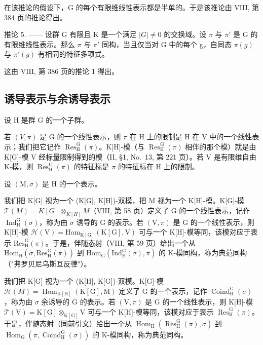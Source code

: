 在该推论的假设下，G 的每个有限维线性表示都是半单的。于是该推论由 VIII, 第 384 页的推论得出。

推论 5. —— 设群 G 有限且 K 是一个满足 \(|G| \neq 0\) 的交换域。设 \(\pi\) 与 \(\pi'\) 是 G 的有限维线性表示。那么 \(\pi\) 与 \(\pi'\) 同构，当且仅当对 G 中的每个 g，自同态 \(\pi(g)\) 与 \(\pi'(g)\) 有相同的特征多项式。

这由 VIII, 第 386 页的推论 1 得出。

\subsection{诱导表示与余诱导表示}

设 H 是群 G 的一个子群。

若 \((V,\pi)\) 是 G 的一个线性表示，则 \(\pi\) 在 H 上的限制是 H 在 V 中的一个线性表示；我们把它记作 \(\operatorname{Res}_{\mathrm{H}}^{\mathrm{G}}(\pi)\)。K{[}H{]}-模（与 \(\operatorname{Res}_{\mathrm{H}}^{\mathrm{G}}(\pi)\) 相伴的那个模）就是由 K{[}G{]}-模 V 经标量限制得到的模（II, §1, No.~13, 第 221 页）。若 V 是有限维自由 K-模，则 \(\operatorname{Res}_{\mathrm{H}}^{\mathrm{G}}(\pi)\) 的特征标是 \(\pi\) 的特征标在 H 上的限制。

设 \((\mathrm{M},\sigma)\) 是 H 的一个表示。

我们把 K{[}G{]} 视为一个 (K{[}G{]}, K{[}H{]})-双模，把 M 视为一个 K{[}H{]}-模。K{[}G{]}-模 \(\mathcal{T}(M) = K[G] \otimes_{K[H]} M\)（VIII, 第 58 页）定义了 G 的一个线性表示，记作 \(\operatorname{Ind}_{\mathrm{H}}^{\mathrm{G}}(\sigma)\)，称为由 \(\sigma\) 诱导的 G 的表示。若 \((\mathrm{V}, \pi)\) 是 G 的一个线性表示，则 K{[}H{]}-模 \(\mathcal{H}(\mathrm{V}) = \mathrm{Hom}_{\mathrm{K[G]}}(\mathrm{K[G]},\mathrm{V})\) 可与一个 K{[}H{]}-模等同，该模对应于表示 \(\mathrm{Res}_{\mathrm{H}}^{\mathrm{G}}(\pi)\)。于是，伴随态射（VIII, 第 59 页）给出一个从 \(\mathrm{Hom}_{\mathrm{H}}(\sigma ,\mathrm{Res}_{\mathrm{H}}^{\mathrm{G}}(\pi))\) 到 \(\mathrm{Hom}_{\mathrm{G}}(\mathrm{Ind}_{\mathrm{H}}^{\mathrm{G}}(\sigma),\pi)\) 的 K-模同构，称为典范同构（"弗罗贝尼乌斯互反律"）。

我们把 K{[}G{]} 视为一个 (K{[}H{]}, K{[}G{]})-双模。K{[}G{]}-模 \(\mathcal{H}(M) = \operatorname{Hom}_{\mathrm{K}[\mathrm{H}]}(\mathrm{K}[\mathrm{G}], \mathrm{M})\) 定义了 G 的一个表示，记作 \(\operatorname{Coind}_{\mathrm{H}}^{\mathrm{G}}(\sigma)\)，称为由 \(\sigma\) 余诱导的 G 的表示。若 \((\mathrm{V}, \pi)\) 是 G 的一个线性表示，则 K{[}H{]}-模 \(\mathcal{T}(\mathrm{V}) = \mathrm{K}[\mathrm{G}] \otimes_{\mathrm{K}[\mathrm{G}]} \mathrm{V}\) 可与一个 K{[}H{]}-模等同，该模对应于表示 \(\operatorname{Res}_{\mathrm{H}}^{\mathrm{G}}(\pi)\)。于是，伴随态射（同前引文）给出一个从 \(\operatorname{Hom}_{\mathrm{H}}(\operatorname{Res}_{\mathrm{H}}^{\mathrm{G}}(\pi), \sigma)\) 到 \(\operatorname{Hom}_{\mathrm{G}}(\pi, \operatorname{Coind}_{\mathrm{H}}^{\mathrm{G}}(\sigma))\) 的 K-模同构，称为典范同构。

